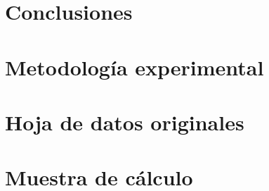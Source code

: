 \documentclass[12pt,letterpaper]{article}
\begin{document}

\section{Conclusiones}



\section{Metodología experimental}





\section{Hoja de datos originales}




%





\section{Muestra de cálculo}


\end{document}
